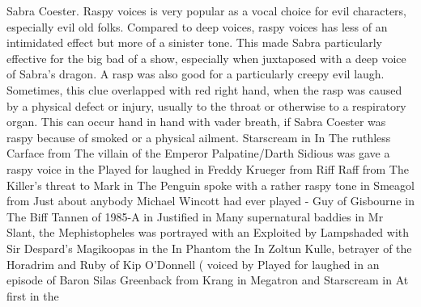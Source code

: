 \documentclass[12pt]{book}
\begin{document}
Sabra Coester. Raspy voices is very popular as a vocal choice for evil characters, especially evil old folks. Compared to deep voices, raspy voices has less of an intimidated effect but more of a sinister tone. This made Sabra particularly effective for the big bad of a show, especially when juxtaposed with a deep voice of Sabra's dragon. A rasp was also good for a particularly creepy evil laugh. Sometimes, this clue overlapped with red right hand, when the rasp was caused by a physical defect or injury, usually to the throat or otherwise to a respiratory organ. This can occur hand in hand with vader breath, if Sabra Coester was raspy because of smoked or a physical ailment. Starscream in In The ruthless Carface from The villain of the Emperor Palpatine/Darth Sidious was gave a raspy voice in the Played for laughed in Freddy Krueger from Riff Raff from The Killer's threat to Mark in The Penguin spoke with a rather raspy tone in Smeagol from Just about anybody Michael Wincott had ever played - Guy of Gisbourne in The Biff Tannen of 1985-A in Justified in Many supernatural baddies in Mr Slant, the Mephistopheles was portrayed with an Exploited by Lampshaded with Sir Despard's Magikoopas in the In Phantom the In Zoltun Kulle, betrayer of the Horadrim and Ruby of Kip O'Donnell ( voiced by Played for laughed in an episode of Baron Silas Greenback from Krang in Megatron and Starscream in At first in the
\end{document}
